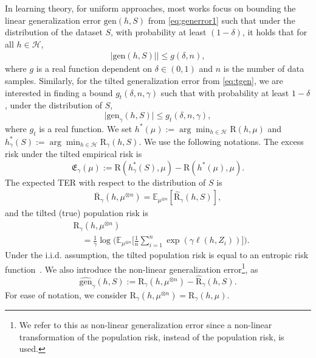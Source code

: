 \documentclass{article}
\theoremstyle{plain}
\theoremstyle{plain}
\theoremstyle{definition}
\theoremstyle{remark}
\newcommand{\RERM}{\widehat{\mathrm{R}}}
\newcommand{\RTERM}{\widehat{\mathrm{R}}_{\gamma}}
\newcommand{\RTrue}{\mathrm{R}}
\newcommand{\RTT}{\overline{\mathrm{R}}_{\gamma}}
\newcommand{\RTET}{\mathrm{R}_{\gamma}}
\newcommand{\LA}{h}
\newcommand{\mbE}{\mathbb{E}}
\begin{document}
In learning theory, for uniform approaches, most works focus on bounding the linear generalization error $\mathrm{gen}(h,S)$ from \eqref{eq:generror1} 
such that under the distribution of the dataset $S$, with probability at least $(1-\delta)$, it holds that for all $h\in\mathcal{H}$,
\begin{equation}\label{eq: tradition gen}
    \begin{split}
       |\mathrm{gen}(h,S)| %
       |\leq g(\delta,n) ,
    \end{split}
\end{equation}
where $g$ is a real function dependent on $\delta\in(0,1)$ and $n$ is the number of data samples. Similarly, for the tilted generalization error from \eqref{eq:tgen}, we are interested in finding a bound $g_t(\delta,n,\gamma)$ such that with probability at least $1- \delta$, under the distribution of $S$,
\begin{equation}\label{eq: gen term}
   \big|\mathrm{gen}_{\gamma}(h,S)\big|\leq g_t(\delta,n,\gamma), 
\end{equation}
where $g_t$ is a real function. We set $h^*(\mu):= \arg \min_{h\in \mathcal{H}} \mathrm{R}(h,\mu)$ and $h_\gamma^*(S):=\arg\min_{h\in \mathcal{H}} \hat{\mathrm{R}}_\gamma(h, S)$. We use the following notations. The excess risk under the tilted empirical risk is 
\begin{equation}\label{eq: excess risk}\mathfrak{E}_{\gamma}(\mu):=\mathrm{R}(h_\gamma^*(S),\mu)-\mathrm{R}(h^*(\mu),\mu). \end{equation} 
The expected TER with respect to the distribution of $S$ is
\begin{equation}\label{eq: RTT}
    \begin{split}
        \RTT(h,\mu^{\otimes n})=\mbE_{\mu^{\otimes n}}[\RTERM(\LA,S)],
    \end{split}
\end{equation}
and the tilted (true) population  risk is
\begin{equation}\label{eq: RTET}
    \begin{split}
        &\RTET(h,\mu^{\otimes n})\\&\quad=\frac{1}{\gamma}\log\Big(\mbE_{\mu^{\otimes n}}\Big[\frac{1}{n}\sum_{i=1}^n\exp(\gamma\ell(h,Z_i))\Big]\Big).
    \end{split}
\end{equation}
Under the i.i.d. assumption, the tilted population risk is equal to an entropic risk function~\citep{howard1972risk}. We also introduce the non-linear generalization error\footnote{We refer to this as non-linear generalization error since a non-linear transformation of the population risk, instead of the population risk, is used. }, as
 \begin{equation}\label{eq: tilted gen}
    \widehat{\mathrm{gen}}_{\gamma}(h,S):= \RTET(h,\mu^{\otimes n})- \RTERM(\LA,S).
\end{equation}
For ease of notation, we consider $\RTET(h,\mu^{\otimes n})=\RTET(h,\mu)$.
\end{document}
